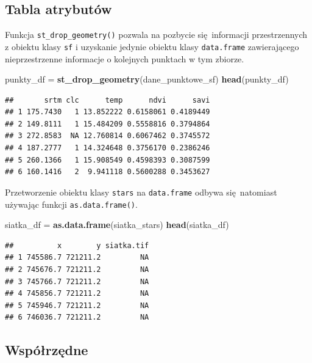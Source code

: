 \documentclass[
  paper=6in:9in,pagesize=pdftex,headinclude=on,footinclude=on,10pt]{scrbook}
\newenvironment{Shaded}{\begin{snugshade}}{\end{snugshade}}
\newcommand{\FunctionTok}[1]{\textcolor[rgb]{0.13,0.29,0.53}{\textbf{#1}}}
\newcommand{\NormalTok}[1]{#1}
\newcommand{\OtherTok}[1]{\textcolor[rgb]{0.56,0.35,0.01}{#1}}
\begin{document}
\subsection{Tabla atrybutów}\label{tabla-atrybutuxf3w}

Funkcja \texttt{st\_drop\_geometry()} pozwala na pozbycie się~informacji przestrzennych z obiektu klasy \texttt{sf} i uzyskanie jedynie obiektu klasy \texttt{data.frame} zawierającego nieprzestrzenne informacje o kolejnych punktach w tym zbiorze.

\begin{Shaded}
\begin{Highlighting}[]
\NormalTok{punkty\_df }\OtherTok{=} \FunctionTok{st\_drop\_geometry}\NormalTok{(dane\_punktowe\_sf)}
\FunctionTok{head}\NormalTok{(punkty\_df)}
\end{Highlighting}
\end{Shaded}

\begin{verbatim}
##       srtm clc      temp      ndvi      savi
## 1 175.7430   1 13.852222 0.6158061 0.4189449
## 2 149.8111   1 15.484209 0.5558816 0.3794864
## 3 272.8583  NA 12.760814 0.6067462 0.3745572
## 4 187.2777   1 14.324648 0.3756170 0.2386246
## 5 260.1366   1 15.908549 0.4598393 0.3087599
## 6 160.1416   2  9.941118 0.5600288 0.3453627
\end{verbatim}

Przetworzenie obiektu klasy \texttt{stars} na \texttt{data.frame} odbywa się~natomiast używając funkcji \texttt{as.data.frame()}.

\begin{Shaded}
\begin{Highlighting}[]
\NormalTok{siatka\_df }\OtherTok{=} \FunctionTok{as.data.frame}\NormalTok{(siatka\_stars)}
\FunctionTok{head}\NormalTok{(siatka\_df)}
\end{Highlighting}
\end{Shaded}

\begin{verbatim}
##          x        y siatka.tif
## 1 745586.7 721211.2         NA
## 2 745676.7 721211.2         NA
## 3 745766.7 721211.2         NA
## 4 745856.7 721211.2         NA
## 5 745946.7 721211.2         NA
## 6 746036.7 721211.2         NA
\end{verbatim}

\subsection{Współrzędne}\label{wspuxf3ux142rzux119dne}
\end{document}
